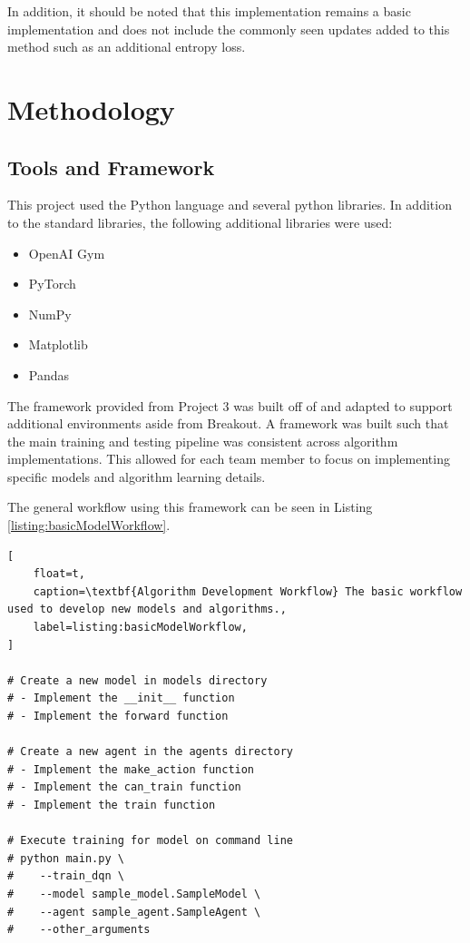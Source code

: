 \documentclass[conference]{IEEEtran}
\begin{document}
In addition, it should be noted that this implementation remains a basic implementation and does not include the commonly seen updates added to this method such as an additional entropy loss.

\section{Methodology} \label{methodology}

\subsection{Tools and Framework}
This project used the Python language and several python libraries. 
In addition to the standard libraries, the following additional libraries were used:
 
\begin{itemize}
    \item OpenAI Gym \cite{openaigym}
    \item PyTorch
    \item NumPy
    \item Matplotlib
    \item Pandas
\end{itemize}

The framework provided from Project 3 was built off of and adapted to support additional environments aside from Breakout.
A framework was built such that the main training and testing pipeline was consistent across algorithm implementations.
This allowed for each team member to focus on implementing specific models and algorithm learning details.

The general workflow using this framework can be seen in Listing \ref{listing:basicModelWorkflow}.

\begin{lstlisting}[
    float=t,
    caption=\textbf{Algorithm Development Workflow} The basic workflow used to develop new models and algorithms.,
    label=listing:basicModelWorkflow,
]

# Create a new model in models directory
# - Implement the __init__ function
# - Implement the forward function

# Create a new agent in the agents directory
# - Implement the make_action function
# - Implement the can_train function
# - Implement the train function

# Execute training for model on command line
# python main.py \
#    --train_dqn \
#    --model sample_model.SampleModel \
#    --agent sample_agent.SampleAgent \
#    --other_arguments

\end{lstlisting}
\end{document}
